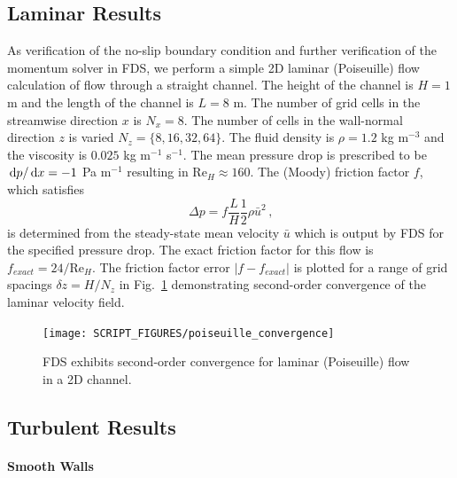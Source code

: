 \documentclass[11pt]{book}
\begin{document}
\subsection{Laminar Results}
\label{laminar}

As verification of the no-slip boundary condition and further verification of the momentum solver in FDS, we perform a simple 2D laminar (Poiseuille) flow calculation of
flow through a straight channel.
The height of the channel is $H=1$ m and the length of the channel is $L=8$ m.
The number of grid cells in the streamwise direction $x$ is $N_x = 8$.  The number of cells in the wall-normal direction $z$ is varied $N_z = \{8,16,32,64\}$.
The fluid density is $\rho = 1.2$ kg m$^{-3}$ and the viscosity is $0.025$ kg m$^{-1}$ s$^{-1}$.
The mean pressure drop is prescribed to be $\,\mathrm{d} p/ \,\mathrm{d} x = -1$ Pa m$^{-1}$ resulting in Re$_H \approx 160$.  The (Moody) friction factor $f$, which satisfies
\begin{equation}
\label{eqn_moodyf}
\Delta p = f \frac{L}{H} \frac{1}{2} \rho \bar{u}^2 \,\mbox{,}
\end{equation}
is determined from the steady-state mean velocity $\bar{u}$ which is output by FDS for the specified pressure drop.  The exact friction factor for this flow is $f_{exact} = 24/\mbox{Re}_H$.  The friction factor error $|f-f_{exact}|$ is plotted for a range of grid spacings $\delta z = H/N_z$ in Fig.~\ref{fig_poiseuille_convergence} demonstrating second-order convergence of the laminar velocity field.
\begin{figure}
\centering
\texttt{[image: SCRIPT\_FIGURES/poiseuille\_convergence]}
\caption[Convergence for laminar (Poiseuille) flow in a 2D channel]{FDS exhibits second-order convergence for laminar (Poiseuille) flow in a 2D channel.}
\label{fig_poiseuille_convergence}
\end{figure}

\subsection{Turbulent Results}
\label{turbulent}

\paragraph{Smooth Walls}
\end{document}
